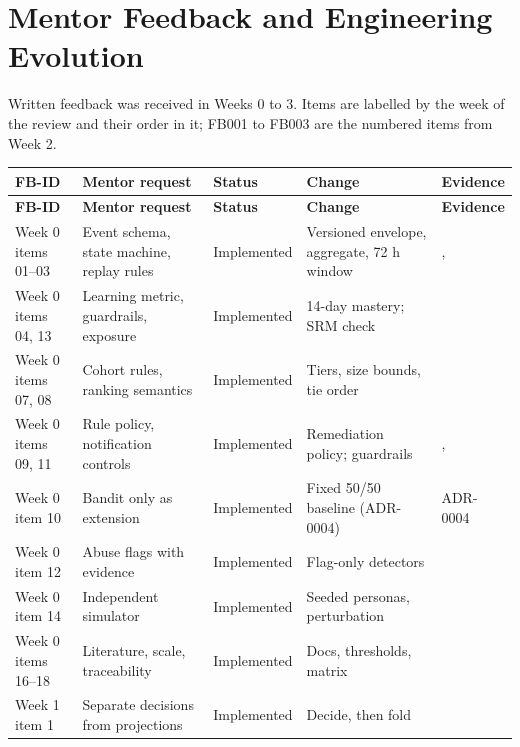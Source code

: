 \documentclass[11pt,a4paper]{article}
\newcommand{\hdr}[1]{\textbf{\color{white}\sffamily\small #1}}
\renewcommand{\_}{\textunderscore\allowbreak{}}
\begin{document}
\section{Mentor Feedback and Engineering Evolution}

Written feedback was received in Weeks 0 to 3. Items are labelled by the week of the review and their order in it; FB001 to FB003 are the numbered items from Week 2.

{\footnotesize
\begin{longtable}{@{}L{2.4cm} L{3.3cm} L{1.9cm} L{3.2cm} L{3.1cm}@{}}
 \hdr{FB-ID} & \hdr{Mentor request} & \hdr{Status} & \hdr{Change} & \hdr{Evidence} \\
\endfirsthead
{} \hdr{FB-ID} & \hdr{Mentor request} & \hdr{Status} & \hdr{Change} & \hdr{Evidence} \\
\endhead
{} Week 0 items 01--03 & Event schema, state machine, replay rules & Implemented & Versioned envelope, aggregate, 72 h window & ,  \\
Week 0 items 04, 13 & Learning metric, guardrails, exposure & Implemented & 14-day mastery; SRM check &  \\
 Week 0 items 07, 08 & Cohort rules, ranking semantics & Implemented & Tiers, size bounds, tie order &  \\
Week 0 items 09, 11 & Rule policy, notification controls & Implemented & Remediation policy; guardrails & ,  \\
 Week 0 item 10 & Bandit only as extension & Implemented & Fixed 50/50 baseline (ADR-0004) & ADR-0004 \\
Week 0 item 12 & Abuse flags with evidence & Implemented & Flag-only detectors &  \\
 Week 0 item 14 & Independent simulator & Implemented & Seeded personas, perturbation &  \\
Week 0 items 16--18 & Literature, scale, traceability & Implemented & Docs, thresholds, matrix &  \\
 Week 1 item 1 & Separate decisions from projections & Implemented & Decide, then fold &  \\

\end{longtable}}
\end{document}
